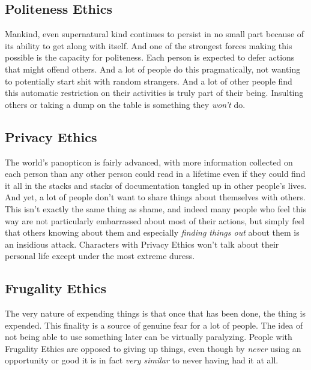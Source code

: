\subsection{Politeness Ethics}

Mankind, even supernatural kind continues to persist in no small part because of its ability to get along with itself. And one of the strongest forces making this possible is the capacity for politeness. Each person is expected to defer actions that might offend others. And a lot of people do this pragmatically, not wanting to potentially start shit with random strangers. And a lot of other people find this automatic restriction on their activities is truly part of their being. Insulting others or taking a dump on the table is something they \textit{won't} do. 

\subsection{Privacy Ethics}

The world's panopticon is fairly advanced, with more information collected on each person than any other person could read in a lifetime even if they could find it all in the stacks and stacks of documentation tangled up in other people's lives. And yet, a lot of people don't want to share things about themselves with others. This isn't exactly the same thing as shame, and indeed many people who feel this way are not particularly embarrassed about most of their actions, but simply feel that others knowing about them and especially \textit{finding things out} about them is an insidious attack. Characters with Privacy Ethics won't talk about their personal life except under the most extreme duress.

\subsection{Frugality Ethics}

The very nature of expending things is that once that has been done, the thing is expended. This finality is a source of genuine fear for a lot of people. The idea of not being able to use something later can be virtually paralyzing. People with Frugality Ethics are opposed to giving up things, even though by \textit{never} using an opportunity or good it is in fact \textit{very similar} to never having had it at all. 

